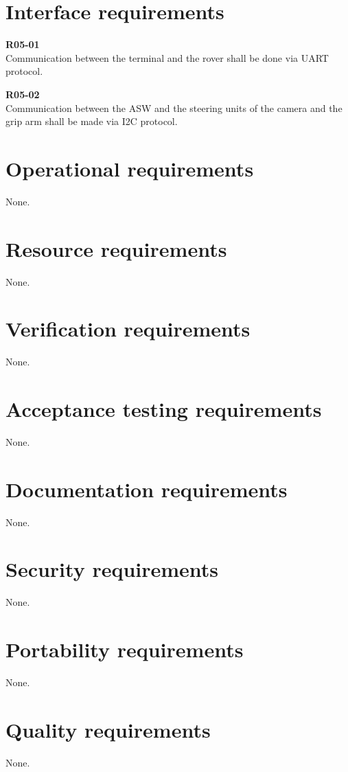 \section{Interface requirements}

\textbf{R05-01}\\
Communication between the terminal and the rover shall be done via UART protocol.\\

\newpage

\textbf{R05-02}\\
Communication between the ASW and the steering units of the camera and the grip arm shall be made via I2C protocol.\\

\section{Operational requirements}
None.

\section{Resource requirements}
None.

\section{Verification requirements}
None.

\section{Acceptance testing requirements}
None.

\section{Documentation requirements}
None.

\section{Security requirements}
None.

\section{Portability requirements}
None.

\section{Quality requirements}
None.

